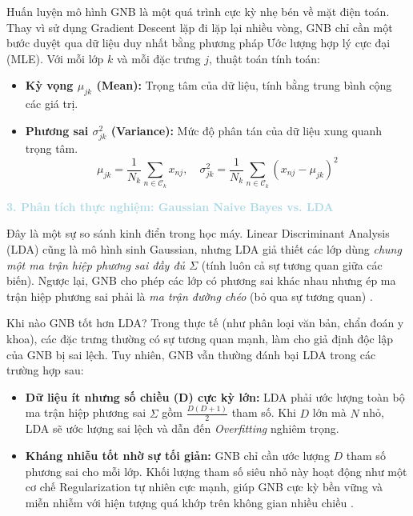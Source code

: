 Huấn luyện mô hình GNB là một quá trình cực kỳ nhẹ bén về mặt điện toán. Thay vì sử dụng Gradient Descent lặp đi lặp lại nhiều vòng, GNB chỉ cần một bước duyệt qua dữ liệu duy nhất bằng phương pháp Ước lượng hợp lý cực đại (MLE). Với mỗi lớp $k$ và mỗi đặc trưng $j$, thuật toán tính toán:
\begin{itemize}
    \item \textbf{Kỳ vọng $\mu_{jk}$ (Mean):} Trọng tâm của dữ liệu, tính bằng trung bình cộng các giá trị.
    \item \textbf{Phương sai $\sigma_{jk}^2$ (Variance):} Mức độ phân tán của dữ liệu xung quanh trọng tâm.
    \begin{equation}
        \mu_{jk} = \frac{1}{N_k} \sum_{n \in \mathcal{C}_k} x_{nj}, \quad \sigma_{jk}^2 = \frac{1}{N_k} \sum_{n \in \mathcal{C}_k} (x_{nj} - \mu_{jk})^2
    \end{equation}
\end{itemize}

\vspace{0.5em}
\noindent\textcolor{lightblue}{\textbf{3. Phân tích thực nghiệm: Gaussian Naive Bayes vs. LDA}}
\vspace{0.5em}

Đây là một sự so sánh kinh điển trong học máy. Linear Discriminant Analysis (LDA) cũng là mô hình sinh Gaussian, nhưng LDA giả thiết các lớp dùng \textit{chung một ma trận hiệp phương sai đầy đủ $\Sigma$} (tính luôn cả sự tương quan giữa các biến). Ngược lại, GNB cho phép các lớp có phương sai khác nhau nhưng ép ma trận hiệp phương sai phải là \textit{ma trận đường chéo} (bỏ qua sự tương quan) \cite{bishop2006pattern}.

\begin{notebox}{Khi nào GNB tốt hơn LDA?}
Trong thực tế (như phân loại văn bản, chẩn đoán y khoa), các đặc trưng thường có sự tương quan mạnh, làm cho giả định độc lập của GNB bị sai lệch. Tuy nhiên, GNB vẫn thường đánh bại LDA trong các trường hợp sau:
\begin{itemize}
    \item \textbf{Dữ liệu ít nhưng số chiều (D) cực kỳ lớn:} LDA phải ước lượng toàn bộ ma trận hiệp phương sai $\Sigma$ gồm $\frac{D(D+1)}{2}$ tham số. Khi $D$ lớn mà $N$ nhỏ, LDA sẽ ước lượng sai lệch và dẫn đến \textit{Overfitting} nghiêm trọng.
    \item \textbf{Kháng nhiễu tốt nhờ sự tối giản:} GNB chỉ cần ước lượng $D$ tham số phương sai cho mỗi lớp. Khối lượng tham số siêu nhỏ này hoạt động như một cơ chế Regularization tự nhiên cực mạnh, giúp GNB cực kỳ bền vững và miễn nhiễm với hiện tượng quá khớp trên không gian nhiều chiều \cite{goodfellow2016deep}.
\end{itemize}
\end{notebox}


